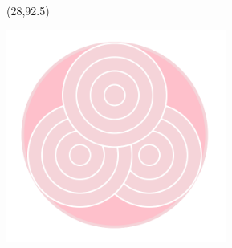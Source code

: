 \documentclass[hyperref={pdfpagelabels=false}]{beamer}
\begin{document}
\begin{frame}
	



	\begin{textblock}{30}(28,92.5)
		\begin{blankbox}
			\includegraphics[width=205pt]{img/Teamlogo.png}

		\end{blankbox}
	\end{textblock}



\end{frame}
\end{document}
